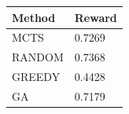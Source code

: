 \begin{tabular}{ll}
\hline
Method & Reward \\
\hline
  MCTS & 0.7269 \\
  RANDOM & 0.7368 \\
  GREEDY & 0.4428 \\
  GA & 0.7179 \\
\hline
\end{tabular}
